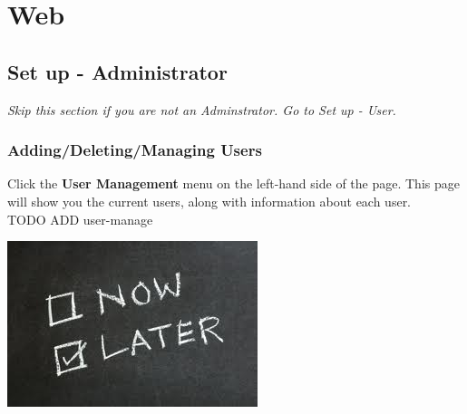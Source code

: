   \section{Web}
  \subsection{Set up - Administrator}
  \emph{Skip this section if you are not an Adminstrator. Go to Set up - User.}\\
  \subsubsection{Adding/Deleting/Managing Users}
    Click the \textbf{User Management} menu on the left-hand side of the page.  This page will
      show you the current users, along with information about each user.\\
TODO ADD user-manage
      \begin{center}
      \includegraphics[scale=1]{images/Now-Later.png}
    \end{center}  
